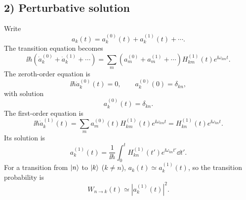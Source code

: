\subsection*{2) Perturbative solution}
Write
\begin{equation}
 a_k(t)=a_k^{(0)}(t)+a_k^{(1)}(t)+\cdots.
\end{equation}
The transition equation becomes
\begin{equation}
 \ii\hbar(\dot a_k^{(0)}+\dot a_k^{(1)}+\cdots)
 =\sum_m(a_m^{(0)}+a_m^{(1)}+\cdots)
 H_{km}^{(1)}(t)e^{\ii\omega_{km}t}.
\end{equation}
The zeroth-order equation is
\begin{equation}
 \ii\hbar\dot a_k^{(0)}(t)=0,\qquad
 a_k^{(0)}(0)=\delta_{kn},
\end{equation}
with solution
\begin{equation}
 a_k^{(0)}(t)=\delta_{kn}.
\end{equation}
The first-order equation is
\begin{equation}
 \ii\hbar\dot a_k^{(1)}(t)
 =\sum_m a_m^{(0)}(t)H_{km}^{(1)}(t)e^{\ii\omega_{km}t}
 =H_{kn}^{(1)}(t)e^{\ii\omega_{kn}t}.
\end{equation}
Its solution is
\begin{equation}
 \boxed{a_k^{(1)}(t)=\frac1{\ii\hbar}
 \int_0^t H_{kn}^{(1)}(t')e^{\ii\omega_{kn}t'}\dd t'.}
\end{equation}
For a transition from $\left|n\right\rangle$ to $\left|k\right\rangle$ ($k\ne n$), $a_k(t)\simeq a_k^{(1)}(t)$, so the transition probability is
\begin{equation}
 W_{n\to k}(t)\simeq|a_k^{(1)}(t)|^2.
\end{equation}
